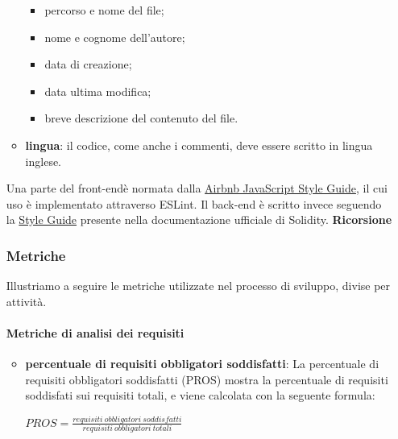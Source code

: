 \begin{itemize}
\begin{itemize}
						\begin{itemize}
							\item percorso e nome del file;
							\item nome e cognome dell'autore;
							\item data di creazione;
							\item data ultima modifica;
							\item breve descrizione del contenuto del file.
						\end{itemize}
					\item \textbf{lingua}: il codice, come anche i commenti, deve essere scritto 
						in lingua inglese.
				\end{itemize}
			Una parte del front-end\glosp è normata dalla \href{https://github.com/airbnb/javascript/blob/master/README.md}{Airbnb JavaScript Style Guide}, il cui uso è implementato attraverso ESLint\glo.\newline
			Il back-end è scritto invece seguendo la \href{https://solidity.readthedocs.io/en/v0.5.7/style-guide.html}{Style Guide} presente nella documentazione ufficiale di Solidity.
			 \newline \newline
			\noindent\textbf{Ricorsione}  \mbox{}\\
			
			
			
			
	\subsubsection{Metriche}
	Illustriamo a seguire le metriche utilizzate nel processo di sviluppo, divise per attività.
		\paragraph{Metriche di analisi dei requisiti}
		\begin{itemize}
			\item \textbf{percentuale di requisiti obbligatori soddisfatti}:
			La percentuale di requisiti obbligatori soddisfatti (PROS) mostra la percentuale di requisiti soddisfati sui requisiti totali, e viene calcolata con la seguente formula:	
			\begin{center}
				$ PROS = \frac{requisiti\ obbligatori\ soddisfatti}{requisiti\ obbligatori\ totali}$
			\end{center}		
		\end{itemize}		

\end{itemize}
